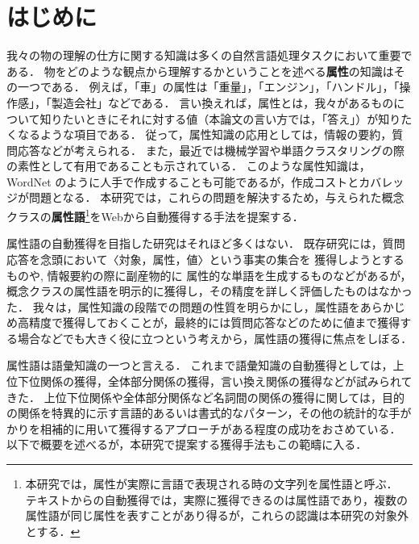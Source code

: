 \maketitle
\thispagestyle{empty}

\section{はじめに}
\label{sec:intro}
我々の物の理解の仕方に関する知識は多くの自然言語処理タスクにおいて重要である．
物をどのような観点から理解するかということを述べる{\bf 属性}の知識はその一つである．
例えば，「車」の属性は「重量」，「エンジン」，「ハンドル」，「操作感」，「製造会社」などである．
言い換えれば，属性とは，我々があるものについて知りたいときにそれに対する値（本論文の言い方では，「答え」）が知りたくなるような項目である．
従って，属性知識の応用としては，情報の要約\cite{yoshida_wda,yoshida_ai2004_en}，質問応答\cite{Fleischman_2003,takahashi_2004}などが考えられる．
また，最近では機械学習や単語クラスタリングの際の素性として有用であることも示されている\cite{almuhareb-poesio:2004:EMNLP}．
このような属性知識は，WordNet \cite{WordNet}のように人手で作成することも可能であるが，作成コストとカバレッジが問題となる．
本研究では，これらの問題を解決するため，与えられた概念クラスの{\bf 属性語}\footnote{本研究では，属性が実際に言語で表現される時の文字列を属性語と呼ぶ． テキストからの自動獲得では，実際に獲得できるのは属性語であり，複数の属性語が同じ属性を表すことがあり得るが，これらの認識は本研究の対象外とする．}をWebから自動獲得する手法を提案する．

属性語の自動獲得を目指した研究はそれほど多くはない．
既存研究には，質問応答を念頭において〈対象，属性，値〉という事実の集合を
獲得しようとするもの\cite{Fleischman_2003,takahashi_2004}や,
情報要約の際に副産物的に
属性的な単語を生成するもの\cite{yoshida_wda,yoshida_ai2004_en}などがあるが，概念クラスの属性語を明示的に獲得し，その精度を詳しく評価したものはなかった．
我々は，属性知識の段階での問題の性質を明らかにし，属性語をあらかじめ高精度で獲得しておくことが，最終的には質問応答などのために値まで獲得する場合などでも大きく役に立つという考えから，属性語の獲得に焦点をしぼる．

属性語は語彙知識の一つと言える．
これまで語彙知識の自動獲得としては，上位下位関係の獲得\cite{Hearst_1992,Shinzato_2004_NAACL04_eng}，全体部分関係の獲得\cite{Barland_ACL1999}，言い換え関係の獲得\cite{Barzilay01}などが試みられてきた．
上位下位関係や全体部分関係など名詞間の関係の獲得に関しては，目的の関係を特異的に示す言語的あるいは書式的なパターン，その他の統計的な手がかりを相補的に用いて獲得するアプローチがある程度の成功をおさめている\cite{Hearst_1992,Barland_ACL1999,Shinzato_2004_NAACL04_eng}．
以下で概要を述べるが，本研究で提案する獲得手法もこの範疇に入る．


